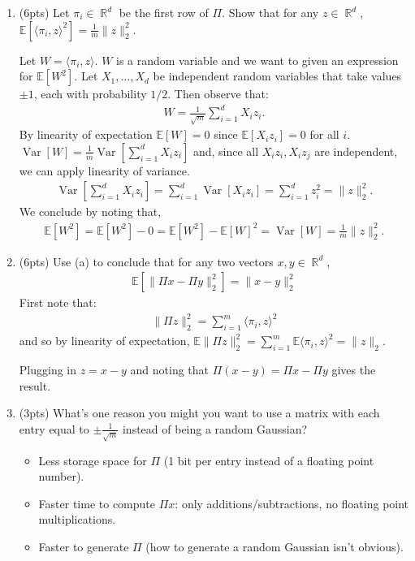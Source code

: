\documentclass[10pt]{article}
\DeclareMathOperator{\R}{\mathbb{R}}
\newcommand{\E}{\mathbb{E}}
\DeclareMathOperator{\Var}{Var}
\begin{document}
\begin{enumerate}[label=(\alph*)]
	\item (6pts) Let $\pi_i \in \R^d$ be the first row of $\Pi$. Show that for any $z \in \R^d$, $\E[ \langle\pi_i, z\rangle^2] = \frac{1}{m}\|z\|_2^2$.
	\vspace{1em}
	
	Let $W = \langle\pi_i, z\rangle$. $W$ is a random variable and we want to given an expression for $\E[W^2]$. 
	Let $X_1, \ldots, X_d$ be independent random variables that take values $\pm 1$, each with probability $1/2$. Then observe that:
	\begin{align*}
	W = \frac{1}{\sqrt{m}} \sum_{i=1}^d X_i z_i.
	\end{align*}
	By linearity of expectation $\E[W] = 0$ since $\E[X_i z_i] = 0$ for all $i$. 
	$\Var[W]  = \frac{1}{m} \Var[\sum_{i=1}^d X_i z_i]$ and, since all $X_iz_i, X_iz_j$ are independent, we can apply linearity of variance.
	\begin{align*}
	\Var[\sum_{i=1}^d X_i z_i] = \sum_{i=1}^d \Var[X_i z_i] = \sum_{i=1}^d z_i^2 = \|z\|_2^2. 
	\end{align*}
	We conclude by noting that,
	\begin{align*}
	\E[W^2] = \E[W^2] - 0  =  \E[W^2] - \E[W]^2 = \Var[W] = \frac{1}{m}\|z\|_2^2.
	\end{align*}
	
	\item (6pts) Use (a) to conclude that for any two vectors $x,y \in \R^d$, 
	\begin{align*}
		\E[\|\Pi x - \Pi y\|_2^2] = \|x - y\|_2^2
	\end{align*}
	First note that:
	\begin{align*}
	\|\Pi z\|_2^2 = \sum_{i=1}^m \langle\pi_i, z\rangle^2
	\end{align*} 
	and so by linearity of expectation, $\E \|\Pi z\|_2^2  = \sum_{i=1}^m \E\langle\pi_i, z\rangle^2 = \|z\|_2$. 
	
	Plugging in $z = x-y$ and noting that $\Pi (x - y) = \Pi x - \Pi y$ gives the result.

	
	\item (3pts) What's one reason you might you want to use a matrix with each entry equal to $\pm\frac{1}{\sqrt{m}}$ instead of being a random Gaussian?
	\begin{itemize}
		\item Less storage space for $\Pi$ (1 bit per entry instead of a floating point number).
		\item Faster time to compute $\Pi x$: only additions/subtractions, no floating point multiplications. 
		\item Faster to generate $\Pi$ (how to generate a random Gaussian isn't obvious). 
	\end{itemize}
\end{enumerate}
\end{document}
